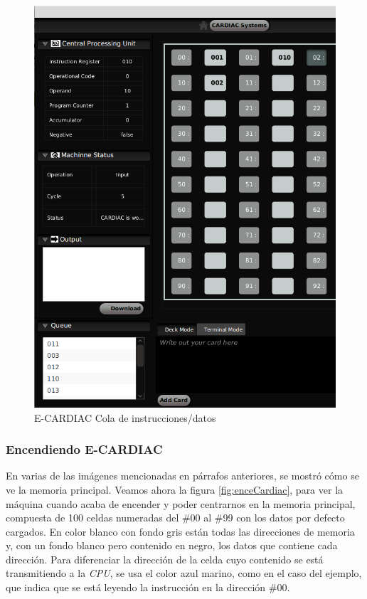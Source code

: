 \documentclass[letterpaper,12pt,oneside]{book}
\begin{document}
	\begin{figure}[H]
 			\centering
			\includegraphics[scale=0.4]{media/ECARDIAC/QueueCargada.png}
			\caption{E-CARDIAC Cola de instrucciones/datos}
			\label{fig:ecardiacQueue}
	\end{figure}		

 \subsubsection{Encendiendo E-CARDIAC}

	En varias de las imágenes mencionadas en párrafos anteriores, se mostró cómo se ve la memoria principal. Veamos ahora la figura 
	\ref{fig:enceCardiac}, para ver la máquina cuando acaba de encender y poder centrarnos en la memoria principal, compuesta de 100 celdas numeradas del \#00 al \#99 con los datos
	por defecto cargados. En color blanco con fondo gris están todas las direcciones de memoria y, con un fondo blanco pero
	contenido en negro, los datos que contiene cada dirección. Para diferenciar la dirección de la celda cuyo contenido se está transmitiendo a la \textit{CPU}, se usa el color azul marino, como en el caso del ejemplo, que indica que se está leyendo la instrucción en la dirección \#00.
	
\end{document}
